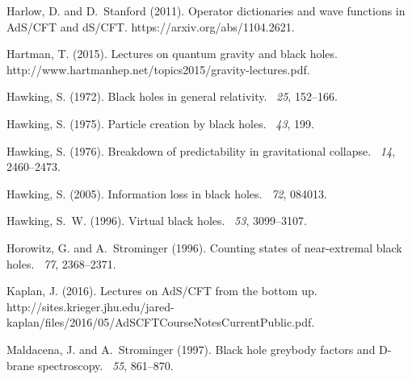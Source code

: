 \documentclass{article}
\begin{document}
\begin{thebibliography}{}
Harlow, D. and D.~Stanford (2011).
\newblock Operator dictionaries and wave functions in {A}d{S}/{CFT} and
  d{S}/{CFT}.
\newblock https://arxiv.org/abs/1104.2621.

Hartman, T. (2015).
\newblock Lectures on quantum gravity and black holes.
\newblock http://www.hartmanhep.net/topics2015/gravity-lectures.pdf.

Hawking, S. (1972).
\newblock Black holes in general relativity.
~{\em 25}, 152--166.

Hawking, S. (1975).
\newblock Particle creation by black holes.
~{\em 43}, 199.

Hawking, S. (1976).
\newblock Breakdown of predictability in gravitational collapse.
~{\em 14}, 2460--2473.

Hawking, S. (2005).
\newblock Information loss in black holes.
~{\em 72}, 084013.

Hawking, S.~W. (1996).
\newblock Virtual black holes.
~{\em 53}, 3099--3107.

Horowitz, G. and A.~Strominger (1996).
\newblock Counting states of near-extremal black holes.
~{\em 77}, 2368--2371.

Kaplan, J. (2016).
\newblock Lectures on {A}d{S}/{CFT} from the bottom up.
\newblock
  http://sites.krieger.jhu.edu/jared-kaplan/files/2016/05/AdSCFTCourseNotesCurrentPublic.pdf.

Maldacena, J. and A.~Strominger (1997).
\newblock Black hole greybody factors and {D}-brane spectroscopy.
~{\em 55}, 861--870.


\end{thebibliography}
\end{document}
